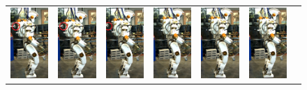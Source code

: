 \documentclass[letterpaper, 10 pt, conference]{ieeeconf}  %
\begin{document}
\begin{figure}[h]
\centering
  \begin{tabular}{ccccccc}
    \includegraphics[width=0.84in]{val1zr} &
    \includegraphics[width=0.84in]{val2zr} &
    \includegraphics[width=0.84in]{val3zr} &
    \includegraphics[width=0.84in]{val4z} &
    \includegraphics[width=0.84in]{val5z} &
    \includegraphics[width=0.84in]{val6z} &

\end{tabular}
\end{figure}
\end{document}
